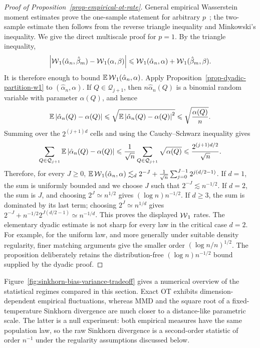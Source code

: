 \begin{proof}[Proof of Proposition~\ref{prop-empirical-ot-rate}]
	General empirical Wasserstein moment estimates prove the one-sample statement for arbitrary \(p\)~\cite{dereich2013constructive,fournier2015rate}; the two-sample estimate then follows from the reverse triangle inequality and Minkowski's inequality. We give the direct multiscale proof for \(p=1\).
	By the triangle inequality,
	\[
		\left\lvert\operatorname{\mathcal{W}}_1(\hat\alpha_n,\hat\beta_m)-\operatorname{\mathcal{W}}_1(\alpha,\beta)\right\rvert
		\leqslant
		\operatorname{\mathcal{W}}_1(\hat\alpha_n,\alpha)+\operatorname{\mathcal{W}}_1(\hat\beta_m,\beta).
	\]
	It is therefore enough to bound \(\mathbb{E}\operatorname{\mathcal{W}}_1(\hat\alpha_n,\alpha)\). Apply Proposition~\ref{prop-dyadic-partition-w1} to \((\hat\alpha_n,\alpha)\). If \(Q\in\mathcal Q_{j+1}\), then \(n\hat\alpha_n(Q)\) is a binomial random variable with parameter \(\alpha(Q)\), and hence
	\[
		\mathbb{E}\left\lvert\hat\alpha_n(Q)-\alpha(Q)\right\rvert
		\leqslant
		\sqrt{\mathbb{E}\left\lvert\hat\alpha_n(Q)-\alpha(Q)\right\rvert^2}
		\leqslant
		\sqrt{\frac{\alpha(Q)}{n}}.
	\]
	Summing over the \(2^{(j+1)d}\) cells and using the Cauchy--Schwarz inequality gives
	\[
		\sum_{Q\in\mathcal Q_{j+1}}
		\mathbb{E}\left\lvert\hat\alpha_n(Q)-\alpha(Q)\right\rvert
		\leqslant
		\frac{1}{\sqrt n}
		\sum_{Q\in\mathcal Q_{j+1}}\sqrt{\alpha(Q)}
		\leqslant
		\frac{2^{(j+1)d/2}}{\sqrt n}.
	\]
	Therefore, for every \(J\geq0\),
	$\mathbb{E}\operatorname{\mathcal{W}}_1(\hat\alpha_n,\alpha) \lesssim_d 2^{-J} + \frac1{\sqrt n} \sum_{j=0}^{J-1}2^{j(d/2-1)}$.
	If \(d=1\), the sum is uniformly bounded and we choose \(J\) such that \(2^{-J}\lesssim n^{-1/2}\). If \(d=2\), the sum is \(J\), and choosing \(2^J\simeq n^{1/2}\) gives \((\log n)n^{-1/2}\). If \(d\geq3\), the sum is dominated by its last term; choosing \(2^J\simeq n^{1/d}\) gives \(2^{-J}+n^{-1/2}2^{J(d/2-1)}\simeq n^{-1/d}\).
	This proves the displayed \(\operatorname{\mathcal{W}}_1\) rates. The elementary dyadic estimate is not sharp for every law in the critical case \(d=2\). For example, for the uniform law, and more generally under suitable density regularity, finer matching arguments give the smaller order \((\log n/n)^{1/2}\). The proposition deliberately retains the distribution-free \((\log n)n^{-1/2}\) bound supplied by the dyadic proof.
\end{proof}

Figure~\ref{fig:sinkhorn-bias-variance-tradeoff} gives a numerical overview of the statistical regimes compared in this section. Exact OT exhibits dimension-dependent empirical fluctuations, whereas MMD and the square root of a fixed-temperature Sinkhorn divergence are much closer to a distance-like parametric scale. The latter is a null experiment: both empirical measures have the same population law, so the raw Sinkhorn divergence is a second-order statistic of order $n^{-1}$ under the regularity assumptions discussed below.

